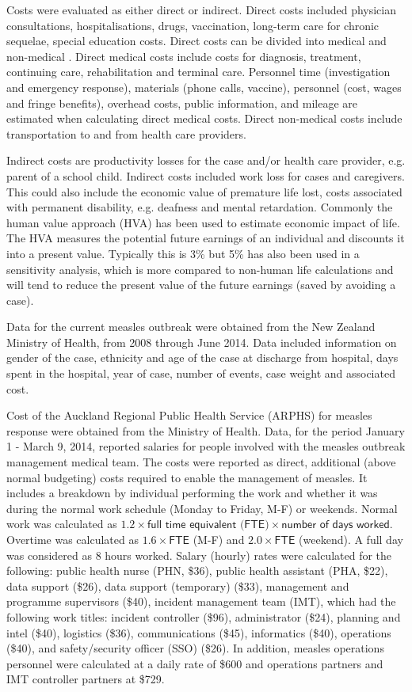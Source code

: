 \documentclass{article}
\begin{document}
Costs were evaluated as either direct or indirect. Direct costs included physician consultations, hospitalisations, drugs, vaccination, long-term care for chronic sequelae, special education costs. Direct costs can be divided into medical and non-medical \citep{saha13}. Direct medical costs include costs for diagnosis, treatment, continuing care, rehabilitation and terminal care. Personnel time (investigation and emergency response), materials (phone calls, vaccine), personnel (cost, wages and fringe benefits), overhead costs, public information, and mileage are estimated when calculating direct medical costs. Direct non-medical costs include transportation to and from health care providers.

Indirect costs are productivity losses for the case and/or health care provider, e.g. parent of a school child. Indirect costs included work loss for cases and caregivers. This could also include the economic value of premature life lost, costs associated with permanent disability, e.g. deafness and mental retardation. Commonly the human value approach (HVA) has been used to estimate economic impact of life. The HVA measures the potential future earnings of an individual and discounts it into a present value. Typically this is 3\% but 5\% has also been used in a sensitivity analysis, which is more compared to non-human life calculations and will tend to reduce the present value of the future earnings (saved by avoiding a case).

Data for the current measles outbreak were obtained from the New Zealand Ministry of Health, from 2008 through June 2014. Data included information on gender of the case, ethnicity and age of the case at discharge from hospital, days spent in the hospital, year of case, number of events, case weight and associated cost.

Cost of the Auckland Regional Public Health Service (ARPHS) for measles response were obtained from the Ministry of Health. Data, for the period January 1 - March 9, 2014, reported salaries for people involved with the measles outbreak management medical team. The costs were reported as direct, additional (above normal budgeting) costs required to enable the management of measles. It includes a breakdown by individual performing the work and whether it was during the normal work schedule (Monday to Friday, M-F) or weekends. Normal work was calculated as $1.2 \times \textsf{full time equivalent (FTE)} \times \textsf{number of days worked}$. Overtime was calculated as $1.6\times\textsf{FTE}$ (M-F) and $2.0 \times \textsf{FTE}$ (weekend). A full day was considered as 8 hours worked. Salary (hourly) rates were calculated for the following: public health nurse (PHN, \$36), public health assistant (PHA, \$22), data support (\$26), data support (temporary) (\$33), management and programme supervisors (\$40), incident management team (IMT), which had the following work titles: incident controller (\$96), administrator (\$24), planning and intel (\$40), logistics (\$36), communications (\$45), informatics (\$40), operations (\$40), and safety/security officer (SSO) (\$26). In addition, measles operations personnel were calculated at a daily rate of \$600 and operations partners and IMT controller partners at \$729.
\end{document}
